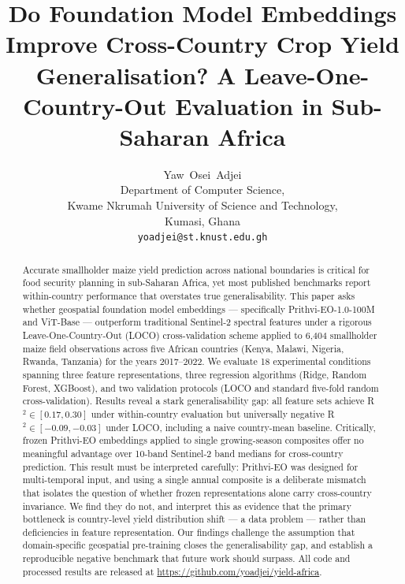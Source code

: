 \documentclass[journal]{IEEEtran}
\begin{document}
\title{Do Foundation Model Embeddings Improve Cross-Country Crop Yield Generalisation?
       A Leave-One-Country-Out Evaluation in Sub-Saharan Africa}

\author{Yaw~Osei~Adjei\\
  Department of Computer Science,\\
  Kwame Nkrumah University of Science and Technology,\\
  Kumasi, Ghana\\
  \texttt{yoadjei@st.knust.edu.gh}
}

\maketitle

\begin{abstract}
Accurate smallholder maize yield prediction across national boundaries is critical
for food security planning in sub-Saharan Africa, yet most published benchmarks
report within-country performance that overstates true generalisability.
This paper asks whether geospatial foundation model embeddings —
specifically Prithvi-EO-1.0-100M and ViT-Base — outperform traditional
Sentinel-2 spectral features under a rigorous Leave-One-Country-Out (LOCO) cross-validation
scheme applied to 6{,}404 smallholder maize field observations across
five African countries (Kenya, Malawi, Nigeria, Rwanda, Tanzania) for
the years 2017--2022.
We evaluate 18 experimental conditions spanning three feature representations,
three regression algorithms (Ridge, Random Forest, XGBoost), and two
validation protocols (LOCO and standard five-fold random cross-validation).
Results reveal a stark generalisability gap:
all feature sets achieve R$^2 \in [0.17, 0.30]$ under within-country evaluation
but universally negative R$^2 \in [-0.09, -0.03]$ under LOCO,
including a naive country-mean baseline.
Critically, frozen Prithvi-EO embeddings applied to single growing-season
composites offer no meaningful advantage over 10-band Sentinel-2 band medians
for cross-country prediction.
This result must be interpreted carefully: Prithvi-EO was designed for
multi-temporal input, and using a single annual composite is a deliberate
mismatch that isolates the question of whether frozen representations alone
carry cross-country invariance.
We find they do not, and interpret this as evidence that the primary bottleneck
is country-level yield distribution shift — a data problem — rather than
deficiencies in feature representation.
Our findings challenge the assumption that domain-specific geospatial
pre-training closes the generalisability gap, and establish a reproducible
negative benchmark that future work should surpass.
All code and processed results are released at
\url{https://github.com/yoadjei/yield-africa}.
\end{abstract}
\end{document}
